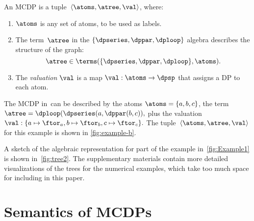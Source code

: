 \begin{definition}
	\label{def:MCDP-algebraic}
	An MCDP is a tuple~$\left\langle \atoms,\atree,\val\right\rangle $,
	where:
	\begin{enumerate}
		\item $\atoms$ is any set of atoms, to be used as labels.
		\item The term~$\atree$ in the $\{\dpseries,\dppar,\dploop\}$ algebra
		      describes the structure of the graph:
		      \[
			      \atree\in\terms(\{\dpseries,\dppar,\dploop\},\atoms).
		      \]
		\item The \emph{valuation} $\val$ is a map $\val:\atoms\rightarrow\dpsp$
		      that assigns a DP to each atom.
	\end{enumerate}
\end{definition}
\begin{example}
	The MCDP in~\XXX can be described by the atoms
	$\atoms=\{a,b,c\}$, the term $\atree=\dploop(\dpseries(a,\dppar(b,c)),$
	plus the valuation $\val:\{a\mapsto\ftor_{a},b\mapsto\ftor_{b},c\mapsto\ftor_{c}\}.
	$
	The tuple~$\left\langle \atoms,\atree,\val\right\rangle $ for this
	example is shown in \cref{fig:example-b}.
\end{example}
\begin{example}
	A sketch of the algebraic representation for part of the example in~\cref{fig:Example1}
	is shown in~\cref{fig:tree2}.
	The supplementary materials contain
	more detailed visualizations of the trees for the numerical examples,
	which take too much space for including in this paper.
\end{example}

\section{Semantics of MCDPs}

